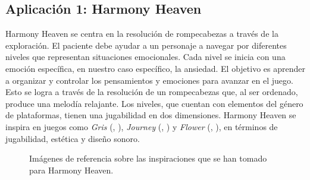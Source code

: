 \subsection{Aplicación 1: Harmony Heaven}

Harmony Heaven se centra en la resolución de rompecabezas a través de la exploración. El paciente debe ayudar a un personaje a navegar por diferentes niveles que representan situaciones emocionales. Cada nivel se inicia con una emoción específica, en nuestro caso específico, la ansiedad. El objetivo es aprender a organizar y controlar los pensamientos y emociones para avanzar en el juego. Esto se logra a través de la resolución de un rompecabezas que, al ser ordenado, produce una melodía relajante. Los niveles, que cuentan con elementos del género de plataformas, tienen una jugabilidad en dos dimensiones. Harmony Heaven se inspira en juegos como \textit{Gris} (\citeauthor{GRIS:2018}, \citeyear{GRIS:2018}), \textit{Journey} (\citeauthor{JOURNEY:2012}, \citeyear{JOURNEY:2012}) y \textit{Flower} (\citeauthor{FLOWER:2009}, \citeyear{FLOWER:2009}), en términos de jugabilidad, estética y diseño sonoro.

\begin{figure}[h!]
	\centering
	\hfil
	\hfil
	\caption[Inspiraciones aplicación Harmony Heaven.]{Imágenes de referencia sobre las inspiraciones que se han tomado para Harmony Heaven.}
	\label{fig:HarmonyHeavenRefs}
	\vspace{-26pt}
\end{figure}

